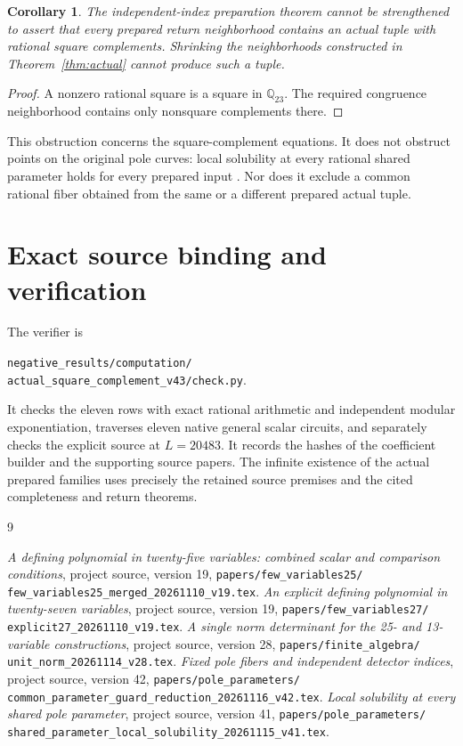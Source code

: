 \documentclass[11pt,a4paper]{article}
\newtheorem{corollary}[theorem]{Corollary}
\newcommand{\Q}{\mathbb Q}\newcommand{\Z}{\mathbb Z}
\begin{document}
\begin{corollary}
The independent-index preparation theorem cannot be strengthened to
assert that every prepared return neighborhood contains an actual tuple
with rational square complements. Shrinking the neighborhoods constructed
in Theorem~\ref{thm:actual} cannot produce such a tuple.
\end{corollary}
\begin{proof}
A nonzero rational square is a square in $\Q_{23}$. The required
congruence neighborhood contains only nonsquare complements there.
\end{proof}

This obstruction concerns the square-complement equations. It does not
obstruct points on the original pole curves: local solubility at every
rational shared parameter holds for every prepared input
\cite{Local}. Nor does it exclude a common rational fiber obtained from
the same or a different prepared actual tuple.

\section{Exact source binding and verification}

The verifier is
\begin{center}\small
\texttt{negative\_results/computation/}\\
\texttt{actual\_square\_complement\_v43/check.py}.
\end{center}
It checks the eleven rows with exact rational arithmetic and independent
modular exponentiation, traverses eleven native general scalar circuits,
and separately checks the explicit source at $L=20483$. It records the
hashes of the coefficient builder and the supporting source papers. The
infinite existence of the actual prepared families uses precisely the
retained source premises and the cited completeness and return theorems.

\begin{thebibliography}{9}
\raggedright
{}
\emph{A defining polynomial in twenty-five variables: combined scalar
and comparison conditions}, project source, version 19,
\texttt{papers/few\_variables25/}\allowbreak
\texttt{few\_variables25\_merged\_20261110\_v19.tex}.
\emph{An explicit defining polynomial in twenty-seven variables},
project source, version 19,
\texttt{papers/few\_variables27/}\allowbreak
\texttt{explicit27\_20261110\_v19.tex}.
\emph{A single norm determinant for the 25- and 13-variable constructions},
project source, version 28,
\texttt{papers/finite\_algebra/}\allowbreak
\texttt{unit\_norm\_20261114\_v28.tex}.
\emph{Fixed pole fibers and independent detector indices},
project source, version 42,
\texttt{papers/pole\_parameters/}\allowbreak
\texttt{common\_parameter\_guard\_reduction\_20261116\_v42.tex}.
\emph{Local solubility at every shared pole parameter},
project source, version 41,
\texttt{papers/pole\_parameters/}\allowbreak
\texttt{shared\_parameter\_local\_solubility\_20261115\_v41.tex}.
\end{thebibliography}
\end{document}
